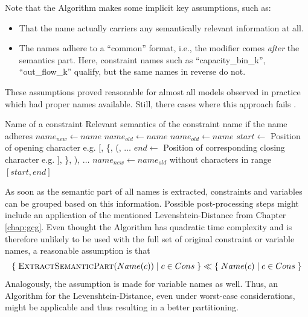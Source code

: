 			Note that the Algorithm makes some implicit key assumptions, such as:
			\begin{itemize}
				\item That the name actually carriers any semantically relevant information at all.
				\item The names adhere to a \enquote{common} format, i.e., the modifier comes \textit{after} the semantics part. Here, constraint names such as \enquote{capacity\_bin\_k}, \enquote{out\_flow\_k} qualify, but the same names in reverse do not.
			\end{itemize}

			These assumptions proved reasonable for almost all models observed in practice which had proper names available. Still, there cases where this approach fails .

			\begin{algorithm}[ht!]
				\centering
				\begin{algorithmic}
					\Require Name of a constraint
					\Ensure Relevant semantics of the constraint name if the name adheres
					\Statex
						\State ${name}_{new} \gets name$
						\State ${name}_{old} \gets name$
						\Repeat
							\State ${name}_{old} \gets name$
							\State $start \gets$ Position of opening character e.g. $\lbrack$, \{, (, $\ldots$
							\State $end \gets$ Position of corresponding closing character e.g. $\rbrack$, \}, ), $\ldots$
							\State ${name}_{new} \gets {name}_{old}$ without characters in range $[start, end]$
					\EndFunction
				\end{algorithmic}
				\caption{}
				\label{algo:tree:scoring:nameheur}
			\end{algorithm}

			As soon as the semantic part of all names is extracted, constraints and variables can be grouped based on this information.
			Possible post-processing steps might include an application of the mentioned Levenshtein-Distance from Chapter \ref{chap:gcg}.
			Even thought the Algorithm has quadratic time complexity and is therefore unlikely to be used with the full set of original constraint or variable names, a reasonable assumption is that
			\begin{equation*}
				\{ \; \Call{ExtractSemanticPart}{Name(c)} \mid c \in Cons \; \} \ll \{ \; Name(c) \mid c \in Cons \; \}
			\end{equation*}
			Analogously, the assumption is made for variable names as well.
			Thus, an Algorithm for the Levenshtein-Distance, even under worst-case considerations, might be applicable and thus resulting in a better partitioning.

